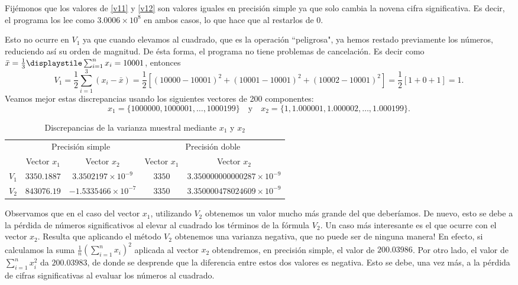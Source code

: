 \documentclass[a4paper]{article}
\begin{document}
Fijémonos que los valores de \eqref{v11} y \eqref{v12} son valores iguales en precisión simple ya que solo cambia la novena cifra significativa. Es decir, el programa los lee como $3.0006\times10^8$ en ambos casos, lo que hace que al restarlos de 0.\par
Esto no ocurre en $V_{1}$ ya que cuando elevamos al cuadrado, que es la operación ``peligrosa", ya hemos restado previamente los números, reduciendo así su orden de magnitud. De ésta forma, el programa no tiene problemas de cancelación. Es decir como $\bar{x}=\frac{1}{3}\displaystile\sum_{i=1}^{n}x_{i}=10001$, entonces $$V_{1}=\frac{1}{2}\sum_{i=1}^{3}(x_i-\bar{x})=\frac{1}{2}\left[(10000-10001)^2+(10001-10001)^2+(10002-10001)^2\right]=\frac{1}{2}\left[1+0+1\right]=1.$$
Veamos mejor estas discrepancias usando los siguientes vectores de 200 componentes: $$x_{1}=\{1000000,1000001,\dots,1000199\}\quad\text{y}\quad x_{2}=\{1, 1.000001, 1.000002, \dots, 1.000199\}.$$\par
\begin{table}[ht]
	\centering
	\begin{tabular}{|c|c|c||c|c|}
	    \hline
	    & \multicolumn{2}{c||}{Precisión simple} & \multicolumn{2}{c|}{Precisión doble}\\
		\cline{2-5} 
		& Vector $x_{1}$ & Vector $x_{2}$ & Vector $x_{1}$ & Vector $x_{2}$\\
		\hline
		$V_{1}$ & $3350.1887$ & $3.3502197\times 10^{-9}$ & $3350$ & $3.350000000000287\times 10^{-9}$\\
		\hline
		$V_{2}$ & $843076.19$ & $-1.5335466\times 10^{-7}$ & $3350$ & $3.350000478024609\times 10^{-9}$\\
		\hline
	\end{tabular}
		\caption{Discrepancias de la varianza muestral mediante $x_{1}$ y $x_{2}$}
		\label{tab:12}
	\end{table}
Observamos que en el caso del vector $x_1$, utilizando $V_2$ obtenemos un valor mucho más grande del que deberíamos. De nuevo, esto se debe a la pérdida de números significativos al elevar al cuadrado los términos de la fórmula $V_2$. Un caso más interesante es el que ocurre con el vector $x_2$. Resulta que aplicando el método $V_2$ obtenemos una varianza negativa, que no puede ser de ninguna manera! En efecto, si calculamos la suma $\frac{1}{n}\left(\sum_{i=1}^{n}x_{i}\right)^2$ aplicada al vector $x_2$ obtendremos, en precisión simple, el valor de $200.03986$. Por otro lado, el valor de $\sum_{i=1}^{n}x_{i}^2$ da $200.03983$, de donde se desprende que la diferencia entre estos dos valores es negativa. Esto se debe, una vez más, a la pérdida de cifras significativas al evaluar los números al cuadrado.
\newpage
\end{document}
